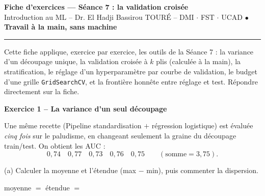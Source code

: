\documentclass[10pt,a4paper]{article}
\newcommand{\repligne}{\par\vspace{0.42cm}\noindent\dotfill}
\newcommand{\zonecalcul}[1]{\par\vspace{0.15cm}\noindent{\small\emph{Espace de calcul :}}\par\vspace{#1}}
\begin{document}
\begin{center}
\textbf{\large Fiche d'exercices --- Séance 7 : la validation croisée}\\[0.05cm]
{\small Introduction au ML -- Dr. El Hadji Bassirou TOURÉ -- DMI $\cdot$ FST $\cdot$ UCAD \quad $\bullet$ \quad \textbf{Travail à la main, sans machine}}
\end{center}

\vspace{-0.15cm}
\hrule
\vspace{0.25cm}

{\small Cette fiche applique, exercice par exercice, les outils de la Séance 7 : la variance d'un découpage unique, la validation croisée à $k$ plis (calculée à la main), la stratification, le réglage d'un hyperparamètre par courbe de validation, le budget d'une grille \texttt{GridSearchCV}, et la frontière honnête entre réglage et test. Répondre directement sur la fiche.}

\vspace{0.2cm}


\vspace{0.45cm}

\textbf{\large Exercice 1 -- La variance d'un seul découpage}

\vspace{0.15cm}

Une même recette (Pipeline standardisation $+$ régression logistique) est évaluée \emph{cinq fois} sur le paludisme, en changeant seulement la graine du découpage train/test. On obtient les AUC :
\[
0{,}74 \quad 0{,}77 \quad 0{,}73 \quad 0{,}76 \quad 0{,}75 \qquad (\text{somme} = 3{,}75).
\]

(a) Calculer la moyenne et l'étendue (max $-$ min), puis commenter la dispersion.
\zonecalcul{1.1cm}
moyenne $=$ \makebox[2.5cm]{\dotfill} \quad étendue $=$ \makebox[2.5cm]{\dotfill}
\repligne
\end{document}
